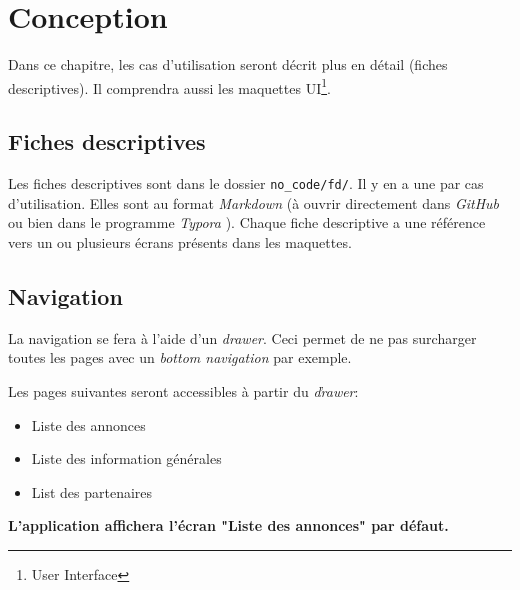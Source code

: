 \documentclass[french]{report}
\begin{document}
\chapter{Conception}
Dans ce chapitre, les cas d'utilisation seront décrit plus en détail (fiches
descriptives). Il comprendra aussi les maquettes UI\footnote{User Interface}.

\section{Fiches descriptives}
Les fiches descriptives sont dans le dossier \verb|no_code/fd/|. Il y en a une par
cas d'utilisation. Elles sont au format \textit{Markdown} (à ouvrir directement dans
\textit{GitHub} ou bien dans le programme \textit{Typora }). Chaque fiche descriptive
a une référence vers un ou plusieurs écrans présents dans les maquettes.

\section{Navigation}
La navigation se fera à l'aide d'un \textit{drawer}. Ceci permet de ne pas surcharger
toutes les pages avec un \textit{bottom navigation} par exemple.

Les pages suivantes seront accessibles à partir du \textit{ďrawer}:
\begin{itemize}
    \item Liste des annonces
    \item Liste des information générales
    \item List des partenaires
\end{itemize}
\vspace{1em}

\textbf{L'application affichera l'écran "Liste des annonces" par défaut.}
\end{document}
